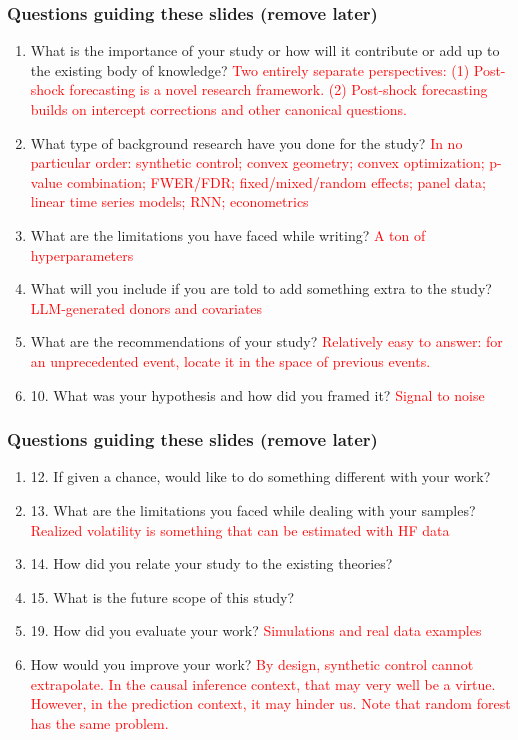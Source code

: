 \documentclass[9pt]{beamer}
\theoremstyle{definition}
\begin{document}
    \begin{frame}
        \frametitle{Questions guiding these slides (remove later)}
        \begin{enumerate}
            \item  What is the importance of your study or how will it contribute or add up to the existing body of knowledge? \textcolor{red}{Two entirely separate perspectives: (1) Post-shock forecasting is a novel research framework. (2) Post-shock forecasting builds on intercept corrections and other canonical questions.}
            \item What type of background research have you done for the study? \textcolor{red}{In no particular order: synthetic control; convex geometry; convex optimization; p-value combination; FWER/FDR; fixed/mixed/random effects; panel data; linear time series models; RNN; econometrics}
            \item What are the limitations you have faced while writing?
            \textcolor{red}{A ton of hyperparameters}
            \item What will you include if you are told to add something extra to the study? \textcolor{red}{LLM-generated donors and covariates}
            \item What are the recommendations of your study? \textcolor{red}{Relatively easy to answer: for an unprecedented event, locate it in the space of previous events.}
            \item 10. What was your hypothesis and how did you framed it? \textcolor{red}{Signal to noise}
        \end{enumerate}
        \end{frame}

\begin{frame}
    \frametitle{Questions guiding these slides (remove later)}
    \begin{enumerate}
        \item 12. If given a chance, would like to do something different with your work?
        \item 13. What are the limitations you faced while dealing with your samples?
        \textcolor{red}{Realized volatility is something that can be estimated with HF data}
        \item 14. How did you relate your study to the existing theories?
        \item 15. What is the future scope of this study?
         \item 19. How did you evaluate your work?
        \textcolor{red}{Simulations and real data examples}
        \item How would you improve your work?  \textcolor{red}{By design, synthetic control cannot extrapolate.  In the causal inference context, that may very well be a virtue.  However, in the prediction context, it may hinder us.  Note that random forest has the same problem.}
    \end{enumerate}
    \end{frame}
\end{document}
